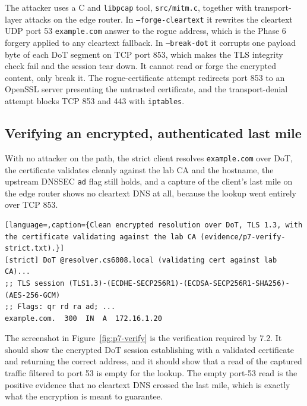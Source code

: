 \documentclass[11pt]{article}
\begin{document}
The attacker uses a C and \texttt{libpcap} tool, \texttt{src/mitm.c}, together with
transport-layer attacks on the edge router. In \texttt{--forge-cleartext} it
rewrites the cleartext UDP port 53 \texttt{example.com} answer to the rogue address,
which is the Phase 6 forgery applied to any cleartext fallback. In
\texttt{--break-dot} it corrupts one payload byte of each DoT segment on TCP port
853, which makes the TLS integrity check fail and the session tear down. It cannot
read or forge the encrypted content, only break it. The rogue-certificate attempt
redirects port 853 to an OpenSSL server presenting the untrusted certificate, and
the transport-denial attempt blocks TCP 853 and 443 with \texttt{iptables}.

\subsection{Verifying an encrypted, authenticated last mile}

With no attacker on the path, the strict client resolves \texttt{example.com} over
DoT, the certificate validates cleanly against the lab CA and the hostname, the
upstream DNSSEC \texttt{ad} flag still holds, and a capture of the client's last
mile on the edge router shows no cleartext DNS at all, because the lookup went
entirely over TCP 853.

\begin{lstlisting}[language=,caption={Clean encrypted resolution over DoT, TLS 1.3, with the certificate validating against the lab CA (evidence/p7-verify-strict.txt).}]
[strict] DoT @resolver.cs6008.local (validating cert against lab CA)...
;; TLS session (TLS1.3)-(ECDHE-SECP256R1)-(ECDSA-SECP256R1-SHA256)-(AES-256-GCM)
;; Flags: qr rd ra ad; ...
example.com.  300  IN  A  172.16.1.20
\end{lstlisting}


The screenshot in Figure~\ref{fig:p7-verify} is the verification required by 7.2.
It should show the encrypted DoT session establishing with a validated
certificate and returning the correct address, and it should show that a read of
the captured traffic filtered to port 53 is empty for the lookup. The empty
port-53 read is the positive evidence that no cleartext DNS crossed the last mile,
which is exactly what the encryption is meant to guarantee.
\end{document}
